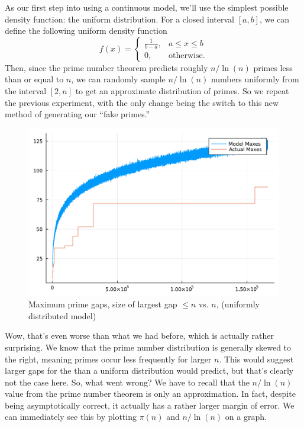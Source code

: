 \documentclass[conference]{IEEEtran}
\begin{document}
As our first step into using a continuous model, we'll
use the simplest possible density function: the uniform
distribution. For a closed interval $[a, b]$, we can
define the following uniform density function
\[f(x) = \begin{cases}\frac{1}{b-a}, & a \le x \le b \\ 0, & \text{otherwise}.\end{cases}\]
Then, since the prime number theorem predicts roughly
$n/\ln(n)$ primes less than or equal to $n$, we can
randomly sample $n/\ln(n)$ numbers uniformly from the
interval $[2, n]$ to get an approximate distribution of
primes. So we repeat the previous experiment, with the
only change being the switch to this new method of
generating our ``fake primes.''

\begin{figure}[H]
  \centering
  \includegraphics[width=\linewidth,keepaspectratio]{random-plot-with-reals.pdf}
  \caption{Maximum prime gaps, size of largest gap $\le n$ vs. $n$, (uniformly distributed model)}
\end{figure}

Wow, that's even worse than what we had before, which is actually rather surprising.
We know that the prime number distribution is generally skewed to the right, meaning
primes occur less frequently for larger $n$. This would suggest larger gaps for the
than a uniform distribution would predict, but that's clearly not the case here. So,
what went wrong? We have to recall that the $n/\ln(n)$ value
from the prime number theorem is only an approximation. In fact, despite being
asymptotically correct, it actually has a rather larger margin of error. We
can immediately see this by plotting $\pi(n)$ and $n/\ln(n)$ on a graph.
\end{document}
